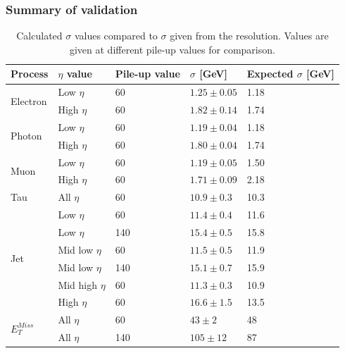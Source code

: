 \documentclass[handout]{beamer}
\begin{document}
\begin{frame}[shrink=10, noframenumbering]\frametitle{Summary of validation}
\begin{table}[H]
\begin{center}
\begin{tabular}{|l|l|l|l|l|}
\hline
Process& $\eta$ value & Pile-up value &$\sigma$ [GeV]& Expected $\sigma$ [GeV]\\ \hline
\multirow{2}{*}{Electron}& Low $\eta$&60&$1.25 \pm 0.05$&1.18\\
&High $\eta$&60&$1.82 \pm 0.14$&1.74\\ \hline
\multirow{2}{*}{Photon} & Low $\eta$&60&$1.19 \pm 0.04$&1.18\\
&High $\eta$&60&$1.80 \pm 0.04$&1.74\\ \hline
\multirow{2}{*}{Muon} & Low $\eta$&60&$1.19 \pm 0.05$&1.50\\
&High $\eta$&60&$1.71 \pm 0.09$&2.18\\ \hline
Tau& All $\eta$&60&$10.9 \pm 0.3$&10.3\\ \hline
\multirow{6}{*}{Jet} &Low $\eta$&60&$11.4 \pm 0.4$&11.6\\
&Low $\eta$&140&$15.4 \pm 0.5$&15.8\\
&Mid low $\eta$&60&$11.5 \pm 0.5$&11.9\\
&Mid low $\eta$&140&$15.1 \pm 0.7$&15.9\\
&Mid high $\eta$&60&$11.3 \pm 0.3$&10.9\\
&High $\eta$&60&$16.6 \pm 1.5$&13.5\\ \hline
\multirow{2}{*}{$E_T^{Miss}$}&All $\eta$&60&$43 \pm 2$&48\\ 
&All $\eta$&140&$105 \pm 12$&87\\  \hline
\end{tabular}
\end{center}
\caption{Calculated $\sigma$ values compared to $\sigma$ given from the resolution. Values are given at different pile-up values for comparison.}
\label{tab:sigmaval}
\end{table}
\end{frame}
\end{document}
